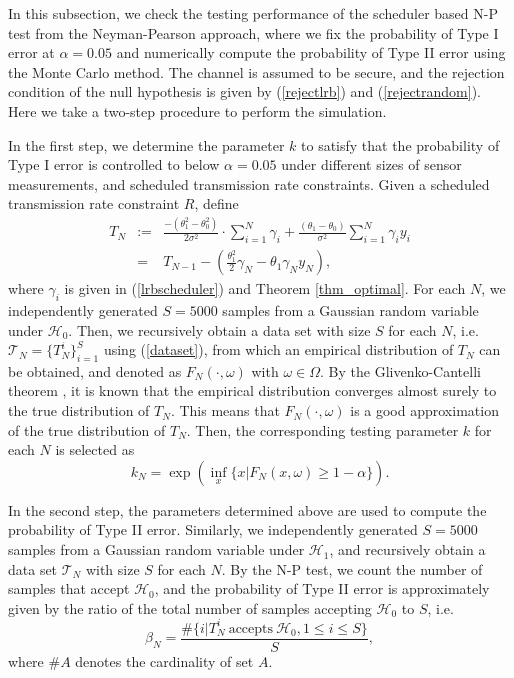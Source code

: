 \documentclass[journal]{IEEEtran}
\def\cH{\mathcal{H}}
\def\cT{\mathcal{T}}
\def\beq{\begin{eqnarray}}
\def\enq{\end{eqnarray}}
\begin{document}
In this subsection, we check the testing performance of the scheduler based N-P test from the Neyman-Pearson approach, where we fix the probability of Type I error at $\alpha=0.05$ and numerically compute the probability of Type II error using the Monte Carlo method.  The channel is assumed to be secure, and the rejection condition of the null hypothesis is given by (\ref{rejectlrb}) and (\ref{rejectrandom}). Here we take a two-step procedure to perform the simulation.

In the first step, we determine the parameter $k$ to satisfy that the probability of Type I error is controlled to below $\alpha=0.05$ under different sizes of sensor measurements, and scheduled transmission rate constraints. Given a scheduled transmission rate constraint $R$, define
\beq\label{dataset}
T_N&:=&  \frac{{ - (\theta _1^2 - \theta _0^2)}}{{2{\sigma ^2}}} \cdot \sum\limits_{i = 1}^N {{\gamma_{i}}}  + \frac{{({\theta _1} - {\theta _0})}}{{{\sigma ^2}}}\sum\limits_{i = 1}^N {{\gamma_{i}y_i}}\nonumber\\
&=&T_{N-1}-\left(\frac{\theta _1^2}{2}\gamma_N-{\theta_1}\gamma_Ny_N\right),
\enq
where $\gamma_i$ is given in (\ref{lrbscheduler}) and Theorem \ref{thm_optimal}. For each $N$, we independently generated $S=5000$ samples from a Gaussian random variable under $\cH_0$. Then, we recursively obtain a data set with size $S$ for each $N$, i.e. $\cT_N=\{T_N^i\}_{i=1}^S$ using  (\ref{dataset}), from which an empirical distribution of $T_N$ can be obtained, and denoted as $F_N(\cdot, \omega)$ with $\omega\in\Omega$. By the Glivenko-Cantelli theorem \cite{billingsley2009convergence}, it is known that the empirical distribution converges  almost surely to the true distribution of $T_N$.  This means that $F_N(\cdot, \omega)$ is a good approximation of the true distribution of $T_N$. Then, the corresponding testing parameter $k$ for each $N$ is selected as
$$k_N=\exp(\inf_{x}\{x|F_N(x,\omega)\geqslant 1-\alpha\}).$$

In the second step,  the parameters determined above are used to compute the probability of Type II error. Similarly, we independently generated $S=5000$ samples from a Gaussian random variable under $\cH_1$, and recursively obtain a data set $\cT_N$ with size $S$ for each $N$. By the N-P test,  we count the number of samples that accept $\cH_0$, and the probability of Type II error is approximately given by the ratio of the total number of samples accepting $\cH_0$ to $S$, i.e.
$$\beta_N=\frac{\#\{i|T_N^i~\text{accepts}~\cH_0, 1\leqslant i\leqslant S\}}{S},$$
where $\#A$ denotes the cardinality of set $A$.
\end{document}

